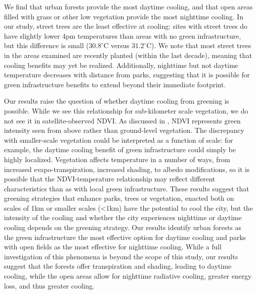 We find that urban forests provide the most daytime cooling, and that open areas filled with grass or other low vegetation provide the most nighttime cooling. 
In our study, street trees are the least effective at cooling:  sites with street trees do have slightly lower 4pm temperatures than areas with no green infrastructure, but this difference is small ($30.8^\circ$C versus $31.2^\circ$C). 
We note that most street trees in the areas examined are recently planted (within the last decade), meaning that cooling benefits may yet be realized. 
Additionally, nighttime but not daytime temperature decreases with distance from parks, suggesting that it is possible for green infrastructure benefits to extend beyond their immediate footprint. 

Our results raise the question of whether daytime cooling from greening is possible. While we see this relationship for sub-kilometer scale vegetation, we do not see it in satellite-observed NDVI. 
As discussed in \cite{scott2017temperature}, NDVI represents green intensity seen from above rather than ground-level vegetation. 
The discrepancy with smaller-scale vegetation could be interpreted as a function of scale: for example, the daytime cooling benefit of green infrastructure could simply be highly localized. 
Vegetation affects temperature in a number of ways, from increased evapo-transpiration, increased shading, to albedo modifications, so it is possible that the NDVI-temperature relationship may reflect different characteristics than as with local green infrastructure. 
These results suggest that greening strategies that enhance parks, trees or vegetation, enacted both on scales of 1km or smaller scales (<1km) have the potential to cool the city, but the intensity of the cooling and whether the city experiences nighttime or daytime cooling depends on the greening strategy. Our results identify urban forests as the green infrastructure the most effective option for daytime cooling and parks with open fields as the most effective for nighttime cooling. 
While a full investigation of this phenomena is beyond the scope of this study, our results suggest that the forests offer transpiration and shading, leading to daytime cooling, while the open areas allow for nighttime radiative cooling, greater energy loss, and thus greater cooling. 

